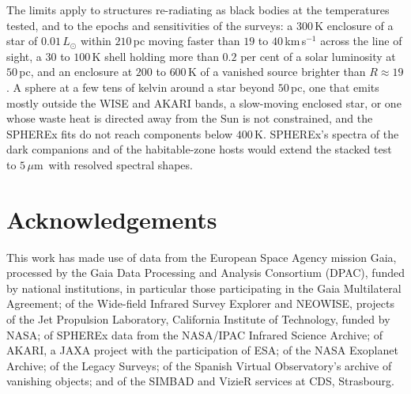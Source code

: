 \documentclass[3p,11pt]{elsarticle}
\newcommand{\um}{\,$\mu$m}
\begin{document}
The limits apply to structures re-radiating as black bodies at the temperatures tested,
and to the epochs and sensitivities of the surveys: a $300$\,K enclosure of a star of
$0.01\,L_\odot$ within $210$\,pc moving faster than $19$ to $40$\,km\,s$^{-1}$ across
the line of sight, a $30$ to $100$\,K shell holding more than $0.2$ per cent of a solar
luminosity at $50$\,pc, and an enclosure at $200$ to $600$\,K of a vanished source
brighter than $R\approx19$. A sphere at a few tens of kelvin
around a star beyond $50$\,pc, one that emits mostly outside the WISE and AKARI bands,
a slow-moving enclosed star, or one whose waste heat is directed away from the Sun is
not constrained, and the SPHEREx fits do not reach components below $400$\,K. SPHEREx's
spectra of the dark companions and of the habitable-zone hosts would extend the
stacked test to $5$\um\ with resolved spectral shapes.

\section*{Acknowledgements}

This work has made use of data from the European Space Agency mission Gaia, processed by
the Gaia Data Processing and Analysis Consortium (DPAC), funded by national institutions,
in particular those participating in the Gaia Multilateral Agreement; of the Wide-field
Infrared Survey Explorer and NEOWISE, projects of the Jet Propulsion Laboratory,
California Institute of Technology, funded by NASA; of SPHEREx data from the NASA/IPAC
Infrared Science Archive; of AKARI, a JAXA project with the participation of ESA; of
the NASA Exoplanet Archive; of the Legacy Surveys; of the Spanish Virtual Observatory's
archive of vanishing objects; and of the SIMBAD and VizieR services at CDS, Strasbourg.
\end{document}
